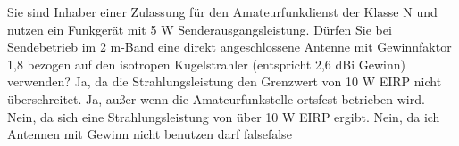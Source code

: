     {Sie sind Inhaber einer Zulassung für den Amateurfunkdienst der Klasse N und nutzen ein Funkgerät mit 5 W Senderausgangsleistung. Dürfen Sie bei Sendebetrieb im 2 m-Band eine direkt angeschlossene Antenne mit Gewinnfaktor 1,8 bezogen auf den isotropen Kugelstrahler (entspricht 2,6 dBi Gewinn) verwenden?}
    {Ja, da die Strahlungsleistung den Grenzwert von 10 W EIRP nicht überschreitet.}
    {Ja, außer wenn die Amateurfunkstelle ortsfest betrieben wird.}
    {Nein, da sich eine Strahlungsleistung von über 10 W EIRP ergibt.}
    {Nein, da ich Antennen mit Gewinn nicht benutzen darf}
    {false}{false}